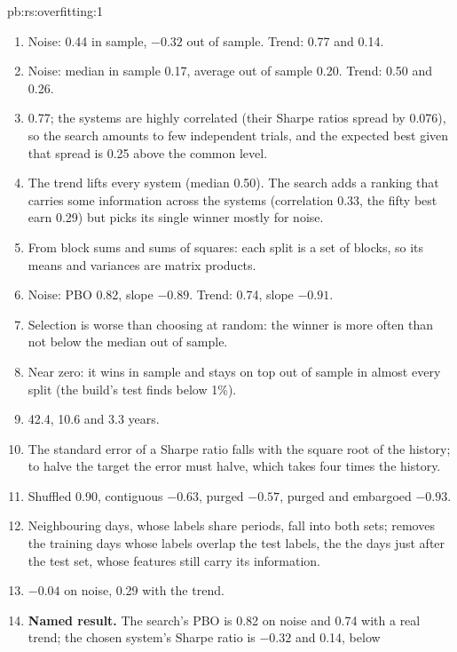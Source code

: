 \begin{solution}{pb:rs:overfitting:1}
\begin{enumerate}
\item Noise: 0.44 in sample, $-0.32$ out of sample. Trend: 0.77 and 0.14.
\item Noise: median in sample 0.17, average out of sample 0.20. Trend: 0.50 and 0.26.
\item 0.77; the systems are highly correlated (their Sharpe ratios spread by 0.076), so the search amounts to few independent trials, and the expected best
given that spread is 0.25 above the common level.
\item The trend lifts every system (median 0.50). The search adds a ranking that carries some information across the systems (correlation 0.33,
the fifty best earn 0.29) but picks its single winner mostly for noise.
\item From block sums and sums of squares: each split is a set of blocks, so its means and variances are matrix products.
\item Noise: PBO 0.82, slope $-0.89$. Trend: 0.74, slope $-0.91$.
\item Selection is worse than choosing at random: the  winner is more often than not below the median out of sample.
\item Near zero: it wins in sample and stays on top out of sample in almost every split (the build's test finds below 1\%).
\item 42.4, 10.6 and 3.3 years.
\item The standard error of a Sharpe ratio falls with the square root of the history; to halve the target the error must halve, which takes four times the
history.
\item Shuffled 0.90, contiguous $-0.63$, purged $-0.57$, purged and embargoed $-0.93$.
\item Neighbouring days, whose labels share periods, fall into both sets;  removes the training days whose labels overlap the test labels, the  the
days just after the test set, whose features still carry its information.
\item $-0.04$ on noise, 0.29 with the trend.
\item \textbf{Named result.} The search's PBO is 0.82 on noise and 0.74 with a real trend; the chosen system's  Sharpe ratio is $-0.32$ and 0.14, below

\end{enumerate}
\end{solution}
